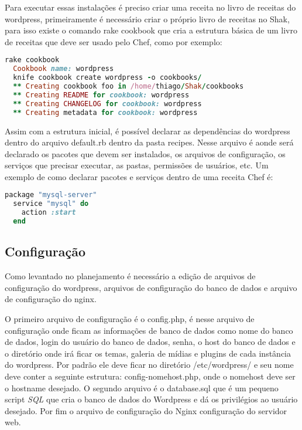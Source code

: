 Para executar essas instalações é preciso criar uma receita no livro de receitas
do wordpress, primeiramente é necessário criar o próprio livro de receitas no Shak,
para isso existe o comando rake cookbook que cria a estrutura básica
de um livro de receitas que deve ser usado pelo Chef, como por exemplo:

\begin{lstlisting}[language=Ruby,label=dice_index,caption={Exemplo de criação de estrutura básica de livro de receitas do wordpress com shak}]
  rake cookbook
  Cookbook name: wordpress
  knife cookbook create wordpress -o cookbooks/
  ** Creating cookbook foo in /home/thiago/Shak/cookbooks
  ** Creating README for cookbook: wordpress
  ** Creating CHANGELOG for cookbook: wordpress
  ** Creating metadata for cookbook: wordpress
\end{lstlisting}

Assim com a estrutura inicial, é possível declarar as dependências do wordpress
dentro do arquivo default.rb dentro da pasta recipes. Nesse arquivo é aonde
será declarado os pacotes que devem ser instalados, os arquivos de configuração,
os serviços que precisar executar, as pastas, permissões de usuários, etc. Um exemplo
de como declarar pacotes e serviços dentro de uma receita Chef é:

\begin{lstlisting}[language=Ruby,label=dice_index,caption={Exemplo de criação de serviço do mysql com o chef}]
  package "mysql-server"
  service "mysql" do
    action :start
  end
\end{lstlisting}


\subsection{Configuração}
\label{wordpress:preparacao}

Como levantado no planejamento é necessário a edição de arquivos de configuração
do wordpress, arquivos de configuração do banco de dados e arquivo de configuração
do nginx.

O primeiro arquivo de configuração é o config.php, é nesse arquivo de
configuração onde ficam as informações de banco de dados como nome do banco de dados,
login do usuário do banco de dados, senha, o host do banco de dados e o diretório
onde irá ficar os temas, galeria de mídias e plugins de cada instância do wordpress.
Por padrão ele deve ficar no diretório /etc/wordpress/ e seu nome deve conter
a seguinte estrutura: config-nomehost.php, onde o nomehost deve ser o hostname
desejado. O segundo arquivo é o database.sql que é um pequeno script \textit{SQL} que
cria o banco de dados do Wordpress e dá os privilégios ao usuário desejado. Por fim
o arquivo de configuração do Nginx configuração do servidor web.

